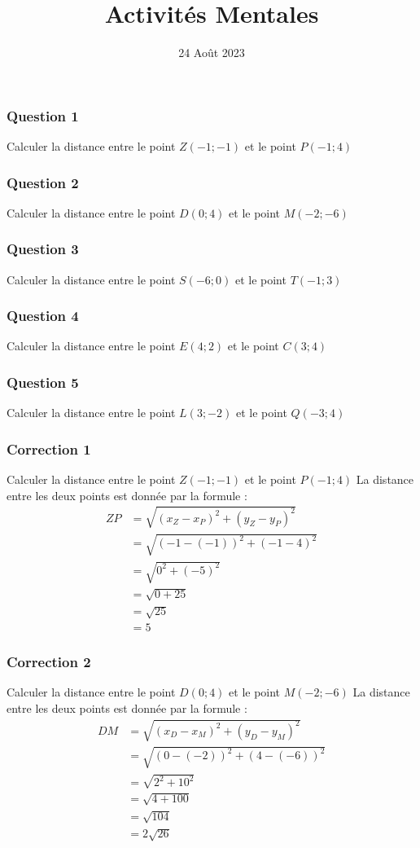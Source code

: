 \documentclass[15pt, mathserif]{beamer}
\title{Activités Mentales}
\date{24 Août 2023}
\begin{document}
\begin{frame}
    \titlepage
\end{frame}

\begin{frame} 
	\frametitle{Question 1}
Calculer la distance entre le point $Z(-1;-1)$ et le point $ P(-1;4)$\end{frame}


\begin{frame} 
	\frametitle{Question 2}
Calculer la distance entre le point $D(0;4)$ et le point $ M(-2;-6)$\end{frame}


\begin{frame} 
	\frametitle{Question 3}
Calculer la distance entre le point $S(-6;0)$ et le point $ T(-1;3)$\end{frame}


\begin{frame} 
	\frametitle{Question 4}
Calculer la distance entre le point $E(4;2)$ et le point $ C(3;4)$\end{frame}


\begin{frame} 
	\frametitle{Question 5}
Calculer la distance entre le point $L(3;-2)$ et le point $ Q(-3;4)$\end{frame}


\begin{frame}
\vspace{-10mm}
	\frametitle{Correction 1}
Calculer la distance entre le point $Z(-1;-1)$ et le point $ P(-1;4)$ La distance entre les deux points est donnée par la formule : \begin{align*} ZP &=\sqrt{(x_Z-x_P)^2 + (y_Z-y_P)^2} \\ &= \sqrt{(-1-\left(-1\right))^2 + (-1-4)^2} \\ &= \sqrt{0^2 +\left(-5\right)^2} \\ &= \sqrt{0+25} \\ &= \sqrt{25} \\ &= 5\end{align*}\end{frame}


\begin{frame}
\vspace{-10mm}
	\frametitle{Correction 2}
Calculer la distance entre le point $D(0;4)$ et le point $ M(-2;-6)$ La distance entre les deux points est donnée par la formule : \begin{align*} DM &=\sqrt{(x_D-x_M)^2 + (y_D-y_M)^2} \\ &= \sqrt{(0-\left(-2\right))^2 + (4-\left(-6\right))^2} \\ &= \sqrt{2^2 +10^2} \\ &= \sqrt{4+100} \\ &= \sqrt{104}  \\ &=2 \sqrt{26} \end{align*}\end{frame}
\end{document}
